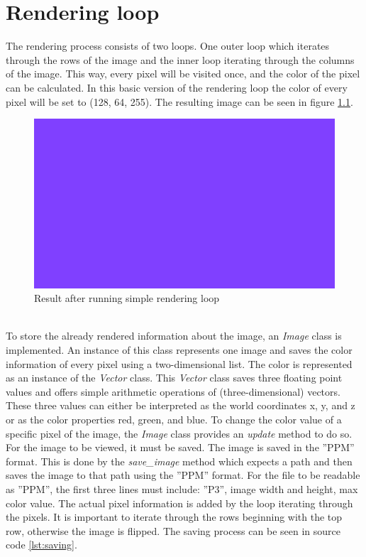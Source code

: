 \documentclass[12pt]{report}
\begin{document}
\chapter{Rendering loop}
\label{chp:step1}
The rendering process consists of two loops. One outer loop which iterates through the rows of the image and the inner loop iterating through the columns of the image. This way, every pixel will be visited once, and the color of the pixel can be calculated. In this basic version of the rendering loop the color of every pixel will be set to (128, 64, 255). The resulting image can be seen in figure \ref{fig:step1}.
\begin{figure}[h!]
\includegraphics[width=\textwidth]{step1}
\centering
\caption{Result after running simple rendering loop}
\label{fig:step1}
\end{figure} \\
To store the already rendered information about the image, an \textit{Image} class is implemented. An instance of this class represents one image and saves the color information of every pixel using a two-dimensional list. The color is represented as an instance of the \textit{Vector} class. This \textit{Vector} class saves three floating point values and offers simple arithmetic operations of (three-dimensional) vectors. These three values can either be interpreted as the world coordinates x, y, and z or as the color properties red, green, and blue. To change the color value of a specific pixel of the image, the \textit{Image} class provides an \textit{update} method to do so. For the image to be viewed, it must be saved. The image is saved in the ''PPM'' format. This is done by the \textit{save\_image} method which expects a path and then saves the image to that path using the ''PPM'' format. For the file to be readable as ''PPM'', the first three lines must include: ''P3'', image width and height, max color value. The actual pixel information is added by the loop iterating through the pixels. It is important to iterate through the rows beginning with the top row, otherwise the image is flipped. The saving process can be seen in source code \ref{lst:saving}.
\end{document}
